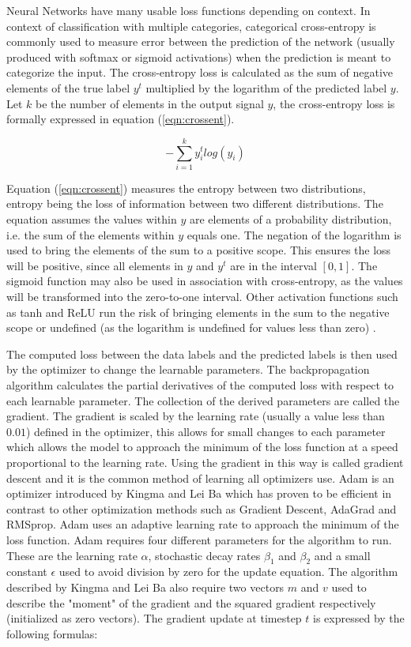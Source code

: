 Neural Networks have many usable loss functions depending on context. In context of classification with multiple categories, categorical cross-entropy is commonly used to measure error between the prediction of the network (usually produced with softmax or sigmoid activations) when the prediction is meant to categorize the input. The cross-entropy loss is calculated as the sum of negative elements of the true label $y^t$ multiplied by the logarithm of the predicted label $y$. Let $k$ be the number of elements in the output signal $y$, the cross-entropy loss is formally expressed in equation (\ref{eqn:crossent}).

\begin{equation}
\label{eqn:crossent}
-\sum_{i=1}^k y_{i}^t log(y_i)
\end{equation}

Equation (\ref{eqn:crossent}) measures the entropy between two distributions, entropy being the loss of information between two different distributions. The equation assumes the values within $y$ are elements of a probability distribution, i.e. the sum of the elements within $y$ equals one. The negation of the logarithm is used to bring the elements of the sum to a positive scope. This ensures the loss will be positive, since all elements in $y$ and $y^t$ are in the interval $[0, 1]$. The sigmoid function may also be used in association with cross-entropy, as the values will be transformed into the zero-to-one interval. Other activation functions such as tanh and ReLU run the risk of bringing elements in the sum to the negative scope or undefined (as the logarithm is undefined for values less than zero) \cite{krippendorff2009mathematical, shannon2001mathematical}.

The computed loss between the data labels and the predicted labels is then used by the optimizer to change the learnable parameters. The backpropagation algorithm calculates the partial derivatives of the computed loss with respect to each learnable parameter. The collection of the derived parameters are called the gradient. The gradient is scaled by the learning rate (usually a value less than $0.01$) defined in the optimizer, this allows for small changes to each parameter which allows the model to approach the minimum of the loss function at a speed proportional to the learning rate. Using the gradient in this way is called gradient descent and it is the common method of learning all optimizers use. Adam is an optimizer introduced by Kingma and Lei Ba \cite{kingma2014adam} which has proven to be efficient in contrast to other optimization methods such as Gradient Descent, AdaGrad and RMSprop. Adam uses an adaptive learning rate to approach the minimum of the loss function. Adam requires four different parameters for the algorithm to run. These are the learning rate $\alpha$, stochastic decay rates $\beta_1$ and $\beta_2$ and a small constant $\epsilon$ used to avoid division by zero for the update equation. The algorithm described by Kingma and Lei Ba also require two vectors $m$ and $v$ used to describe the "moment" of the gradient and the squared gradient respectively (initialized as zero vectors). The gradient update at timestep $t$ is expressed by the following formulas:

